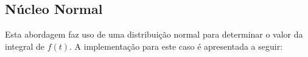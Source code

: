 \documentclass [a4paper,10pt]{article}
\begin{document}
  \subsection{Núcleo Normal}
  	Esta abordagem faz uso de uma distribuição normal para determinar o valor da integral de $f(t)$.
	A implementação para este caso é apresentada a seguir:
    {\linespread{1.15}
    }

  	\pagestyle{fancy}
    \fancyhf{}
    \renewcommand{\footrulewidth}{0.0pt}
    \renewcommand{\headrulewidth}{0.1pt}
    \cfoot{\bfseries \thepage}
    
\end{document}

